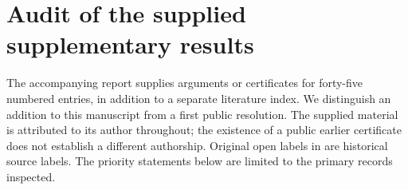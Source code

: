 \documentclass[11pt,a4paper]{article}
\theoremstyle{remark}
\begin{document}
\section{Audit of the supplied supplementary results}
\label{r7:audit}
The accompanying report \cite{UserNotes} supplies arguments or certificates
for forty-five numbered entries, in addition to a separate literature index.
We distinguish an addition to this manuscript from a first public resolution.
The supplied material is attributed to its author throughout; the existence
of a public earlier certificate does not establish a different authorship.
Original open labels in \cite{Archive} are historical source labels.
The priority statements below are limited to the primary records inspected.
\end{document}

